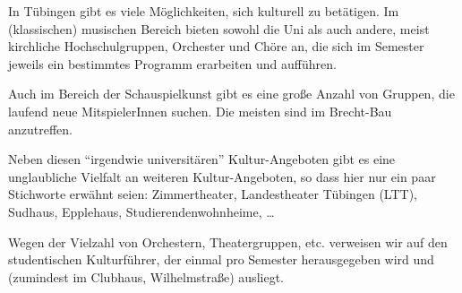 
In Tübingen gibt es viele Möglichkeiten, sich kulturell zu
  betätigen.  Im (klassischen) musischen Bereich bieten sowohl die
  Uni als auch andere, meist kirchliche Hochschulgruppen, Orchester und
  Chöre an, die sich im Semester jeweils ein bestimmtes Programm
  erarbeiten und aufführen.

Auch im Bereich der Schauspielkunst gibt es eine große Anzahl von Gruppen,
  die laufend neue MitspielerInnen suchen.  Die meisten sind im
  Brecht-Bau anzutreffen.

Neben diesen "`irgendwie universitären"' Kultur-Angeboten gibt es eine
  unglaubliche Vielfalt an weiteren Kultur-Angeboten, so dass hier nur
  ein paar Stichworte erwähnt seien:  Zimmertheater, Landestheater Tübingen (LTT), Sudhaus,
  Epplehaus, Studierendenwohnheime, \dots

Wegen der Vielzahl von Orchestern, Theatergruppen, etc. verweisen wir
  auf den studentischen Kulturführer, der einmal pro Semester
  herausgegeben wird und (zumindest im Clubhaus, Wilhelmstraße)
  ausliegt.
